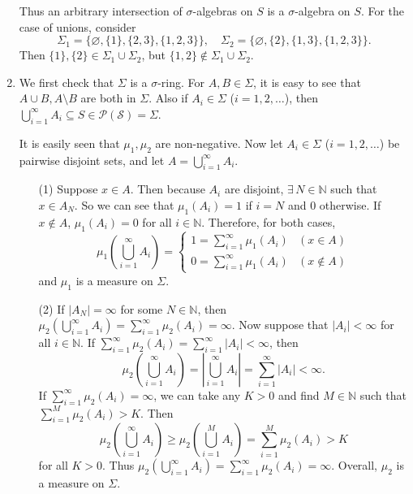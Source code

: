 \documentclass[12pt]{report}
\newcommand{\numl}[1]{\item[\large\textbf{\sffamily #1.}]}
\newcommand{\mc}[1]{\mathcal{#1}}
\newcommand{\bs}{\setminus}
\renewcommand{\subset}{\subseteq}
\newcommand{\abs}[1]{\left| #1 \right|}
\newcommand{\paren}[1]{\left( #1 \right)}
\newcommand{\N}{\mathbb{N}}
\let\oldexists\exists
\renewcommand{\exists}{\oldexists\,}
\begin{document}
\begin{enumerate}
    Thus an arbitrary intersection of \(\sigma\)-algebras on \(S\) is a \(\sigma\)-algebra on \(S\). For the case of unions, consider
    \[
        \Sigma_1 = \{\varnothing, \{1\}, \{2, 3\}, \{1, 2, 3\}\}, \quad \Sigma_2 = \{\varnothing, \{2\}, \{1, 3\}, \{1, 2, 3\}\}.
    \]
    Then \(\{1\}, \{2\} \in \Sigma_1 \cup \Sigma_2\), but \(\{1, 2\}\notin \Sigma_1\cup \Sigma_2\).

    \numl{4} We first check that \(\Sigma\) is a \(\sigma\)-ring. For \(A, B \in \Sigma\), it is easy to see that \(A\cup B, A\bs B\) are both in \(\Sigma\). Also if \(A_i \in \Sigma\) (\(i = 1, 2, \dots\)), then \(\bigcup_{i=1}^\infty A_i \subset S \in \mc{P(S)} = \Sigma\).

    It is easily seen that \(\mu_1, \mu_2\) are non-negative. Now let \(A_i \in \Sigma\) (\(i = 1, 2, \dots\)) be pairwise disjoint sets, and let \(A = \bigcup_{i=1}^\infty A_i\).
    \begin{enumerate}
        \item[(1)] Suppose \(x \in A\). Then because \(A_i\) are disjoint, \(\exists N \in \N\) such that \(x \in A_N\). So we can see that \(\mu_1(A_i) = 1\) if \(i = N\) and 0 otherwise. If \(x \notin A\), \(\mu_1(A_i) = 0\) for all \(i\in \N\). Therefore, for both cases,
            \[
                \mu_1\paren{\bigcup_{i=1}^\infty A_i} = \begin{cases}
                    1 = \sum_{i=1}^\infty \mu_1(A_i) & (x \in A)    \\
                    0 = \sum_{i=1}^\infty \mu_1(A_i) & (x \notin A)
                \end{cases}
            \]
            and \(\mu_1\) is a measure on \(\Sigma\).
        \item[(2)] If \(\abs{A_N} = \infty\) for some \(N \in \N\), then \(\mu_2\paren{\bigcup_{i=1}^\infty A_i} = \sum_{i=1}^\infty \mu_2(A_i) = \infty\). Now suppose that \(\abs{A_i} < \infty\) for all \(i \in \N\). If \(\sum_{i=1}^\infty \mu_2(A_i) = \sum_{i=1}^\infty \abs{A_i} < \infty\), then
            \[
                \mu_2\paren{\bigcup_{i=1}^\infty A_i} = \abs{\bigcup_{i=1}^\infty A_i} = \sum_{i=1}^\infty \abs{A_i} < \infty.
            \]
            If \(\sum_{i=1}^\infty \mu_2(A_i) = \infty\), we can take any \(K > 0\) and find \(M \in \N\) such that \(\sum_{i=1}^M \mu_2(A_i) > K\). Then
            \[
                \mu_2\paren{\bigcup_{i=1}^\infty A_i} \geq \mu_2\paren{\bigcup_{i=1}^M A_i} = \sum_{i=1}^M \mu_2(A_i) > K
            \]
            for all \(K > 0\). Thus \(\mu_2(\bigcup_{i=1}^\infty A_i) = \sum_{i=1}^\infty \mu_2(A_i) = \infty\). Overall, \(\mu_2\) is a measure on \(\Sigma\).
    \end{enumerate}


\end{enumerate}
\end{document}
